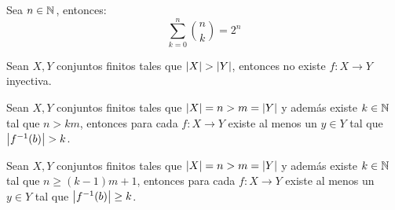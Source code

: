 \begin{coll}
	Sea $n\in\mathbb{N}^{}$, entonces:
	\[ \sum_{k = 0}^{n}\binom{n}{k} = 2^{n} \]
\end{coll}
\begin{theorem}
	Sean $X, Y$ conjuntos finitos tales que $\left\vert X \right\vert >\left\vert Y \right\vert$, entonces no existe $f : X\to Y$ inyectiva.
\end{theorem}
\begin{theorem}
	Sean $X, Y$ conjuntos finitos tales que $\left\vert X \right\vert = n > m =\left\vert Y \right\vert$ y además existe $k\in\mathbb{N}^{}$ tal que $n > km$, entonces para cada $f : X\to Y$ existe al menos un $y\in Y$ tal que $\abs{\minv{f}(b)} > k$.
\end{theorem}
\begin{theorem}
	Sean $X, Y$ conjuntos finitos tales que $\left\vert X \right\vert = n > m =\left\vert Y \right\vert$ y además existe $k\in\mathbb{N}^{}$ tal que $n\geq(k - 1)m + 1$, entonces para cada $f : X\to Y$ existe al menos un $y\in Y$ tal que $\abs{\minv{f}(b)}\geq k$.
\end{theorem}
